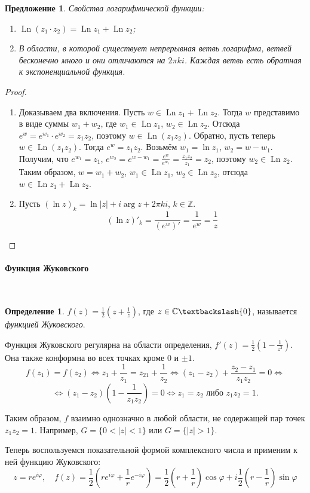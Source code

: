 \documentclass[11pt,openany,a4paper]{scrartcl}
\theoremstyle{plain}
\newtheorem{proposition}[theorem]{Предложение}
\theoremstyle{definition}
\newtheorem{definition}[theorem]{Определение}
\newcommand\mb{\mathbb}
\newcommand{\complex}{\mb C}
\newcommand\lparagraph[1]{\paragraph{#1}\mbox{}\\}
\DeclareMathOperator{\Ln}{Ln}
\begin{document}
\begin{proposition}
	Свойства логарифмической функции:
	\begin{enumerate}
		\item $\Ln (z_1\cdot z_2) = \Ln z_1 + \Ln z_2$;
		\item В области, в которой существует непрерывная ветвь логарифма, ветвей бесконечно много и они отличаются на
		$2\pi ki$. Каждая ветвь есть обратная к экспоненциальной функция.
	\end{enumerate}
\end{proposition}
\begin{proof}
	\begin{enumerate}
		\item Доказываем два включения. Пусть $w \in \Ln z_1 + \Ln z_2$. Тогда $w$ представимо в виде суммы $w_1 + w_2$, где
		$w_1 \in \Ln z_1$, $w_2 \in \Ln z_2$. Отсюда $e^w = e^{w_1}\cdot e^{w_2} = z_1z_2$, поэтому $w \in \Ln (z_1z_2)$.
		Обратно, пусть теперь $w \in \Ln (z_1z_2)$. Тогда $e^w = z_1z_2$. Возьмём $w_1 = \ln z_1$, $w_2 = w - w_1$.
		Получим, что $e^{w_1} = z_1$, $e^{w_2} = e^{w - w_1} = \frac{e^w}{e^{w_1}} = \frac{z_1z_2}{z_1} = z_2$, поэтому
		$w_2 \in \Ln z_2$. Таким образом, $w = w_1 + w_2$, $w_1 \in \Ln z_1$, $w_2 \in \Ln z_2$, отсюда
		$w \in \Ln z_1 + \Ln z_2$.
		\item Пусть $(\ln z)_k = \ln |z| + i\arg z + 2\pi ki$, $k \in \mb Z$.
		$$
		(\ln z)'_k = \frac{1}{(e^w)'} = \frac{1}{e^w} = \frac{1}{z}
		$$
	\end{enumerate}
\end{proof}

\lparagraph{Функция Жуковского}

\begin{definition}
	$f(z) = \frac{1}{2}(z + \frac{1}{z})$, где $z \in \complex \textbackslash \{0\}$, называется \emph{функцией Жуковского}.
\end{definition}

Функция Жуковского регулярна на области определения, $f'(z) = \frac{1}{2}(1 - \frac{1}{z^2})$. Она также конформна во всех 
точках кроме $0$ и $\pm 1$.
$$
f(z_1) = f(z_2) \iff z_1 + \frac{1}{z_1} = z_21 + \frac{1}{z_2} \iff (z_1 - z_2) + \frac{z_2 - z_1}{z_1z_2} = 0 \iff
$$
$$
\iff (z_1 - z_2)(1 - \frac{1}{z_1z_2}) = 0 \iff z_1 = z_2\text{ либо } z_1z_2 = 1.
$$

Таким образом, $f$ взаимно однозначно в любой области, не содержащей пар точек $z_1z_2 = 1$. Например,
$G = \{0 < |z| < 1\}$ или $G = \{|z| > 1\}$.

Теперь воспользуемся показательной формой комплексного числа и применим к ней функцию Жуковского:
$$
z = re^{i\varphi},\quad f(z) = \frac{1}{2}(re^{i\varphi} + \frac{1}{r}e^{-i\varphi}) = \frac{1}{2}(r + \frac{1}{r})\cos \varphi
+ i\frac{1}{2}(r - \frac{1}{r})\sin \varphi
$$
\end{document}
